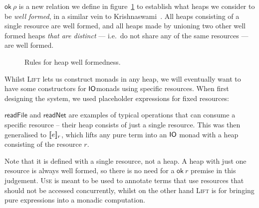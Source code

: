 $\textsf{ok} \ \rho$ is a new relation we define in
figure~\ref{fig:heapwellformedness} to establish what heaps we
consider to be \textit{well formed}, in a similar vein to
Krishnaswami~\cite{krishnaswami2006}. All heaps consisting of a single
resource are well formed, and all heaps made by unioning two other well
formed heaps \textit{that are distinct} --- i.e.\ do not share any of the
same resources --- are well formed.
\begin{figure}
  \centering
  \caption{Rules for heap well formedness.}\label{fig:heapwellformedness}
\end{figure}

Whilst \textsc{Lift} lets us construct monads in any heap, we will
eventually want to have some constructors for $\IO$monads using
specific resources. When first designing the system, we used
placeholder expressions for fixed resources:
$\textsf{readFile}$ and $\textsf{readNet}$ are examples of typical
operations that can consume a specific resource -- their heap consists
of just a single resource. This was then generalised to
$\use{r}{e}$, which lifts any pure term into an $\IO$ monad with a heap
consisting of the resource $r$.
\begin{mathpar}
\end{mathpar}
Note that it is defined with a single resource, not a heap. A heap
with just one resource is always well formed, so there is no need
for a $\textsf{ok} \ r$ premise in this judgement.
\textsc{Use} is meant to be used to annotate terms that use resources that
should not be accessed concurrently, whilst on the other hand
\textsc{Lift} is for bringing pure expressions into a monadic
computation.

